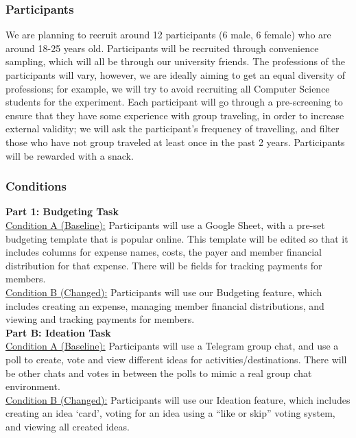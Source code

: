 \documentclass[12pt,a4paper]{article}
\begin{document}
\subsubsection{Participants} 
\par
\indent
We are planning to recruit around 12 participants (6 male, 6 female) who are around 18-25 years old. Participants will be recruited through convenience sampling, which will all be through our university friends. The professions of the participants will vary, however, we are ideally aiming to get an equal diversity of professions; for example, we will try to avoid recruiting all Computer Science students for the experiment. Each participant will go through a pre-screening to ensure that they have some experience with group traveling, in order to increase external validity; we will ask the participant’s frequency of travelling, and filter those who have not group traveled at least once in the past 2 years. Participants will be rewarded with a snack.

\subsubsection{Conditions}
\noindent 
\textbf{Part 1: Budgeting Task}
\\
\underline{Condition A (Baseline):} Participants will use a Google Sheet, with a pre-set budgeting template that is popular online. This template will be edited so that it includes columns for expense names, costs, the payer and member financial distribution for that expense. There will be fields for tracking payments for members. 
\\
\underline{Condition B (Changed):} Participants will use our Budgeting feature, which includes creating an expense, managing member financial distributions, and viewing and tracking payments for members.
\\

\noindent
\textbf{Part B: Ideation Task}
\\
\underline{Condition A (Baseline):} Participants will use a Telegram group chat, and use a poll to create, vote and view different ideas for activities/destinations. There will be other chats and votes in between the polls to mimic a real group chat environment.
\\
\underline{Condition B (Changed):} Participants will use our Ideation feature, which includes creating an idea ‘card’, voting for an idea using a “like or skip” voting system, and viewing all created ideas. 
\end{document}

